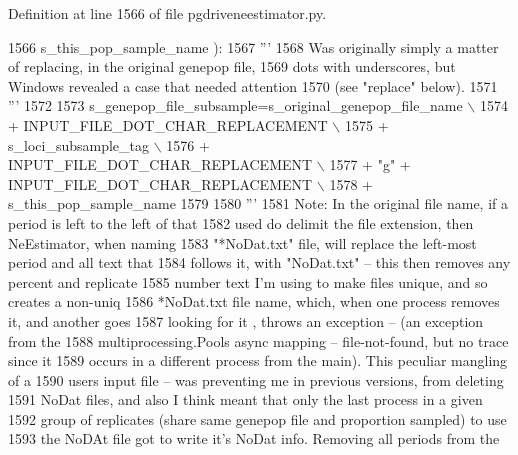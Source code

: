 Definition at line 1566 of file pgdriveneestimator.\+py.


\begin{DoxyCode}
1566                                                     s\_this\_pop\_sample\_name ):
1567     \textcolor{stringliteral}{'''}
1568 \textcolor{stringliteral}{    Was originally simply a matter of replacing, in the original genepop file,}
1569 \textcolor{stringliteral}{    dots with underscores, but Windows revealed a case that needed attention }
1570 \textcolor{stringliteral}{    (see "replace" below).}
1571 \textcolor{stringliteral}{    '''}
1572 
1573     s\_genepop\_file\_subsample=s\_original\_genepop\_file\_name \(\backslash\)
1574                                 + INPUT\_FILE\_DOT\_CHAR\_REPLACEMENT \(\backslash\)
1575                                 +  s\_loci\_subsample\_tag \(\backslash\)
1576                                 + INPUT\_FILE\_DOT\_CHAR\_REPLACEMENT \(\backslash\)
1577                                 + \textcolor{stringliteral}{"g"} + INPUT\_FILE\_DOT\_CHAR\_REPLACEMENT \(\backslash\)
1578                                 + s\_this\_pop\_sample\_name
1579     
1580     \textcolor{stringliteral}{'''}
1581 \textcolor{stringliteral}{    Note: In the original file name, if a period is left to the left of that}
1582 \textcolor{stringliteral}{    used do delimit the file extension, then NeEstimator, when naming}
1583 \textcolor{stringliteral}{    "*NoDat.txt" file, will replace the left-most period and all text that}
1584 \textcolor{stringliteral}{    follows it,  with "NoDat.txt" -- this then removes any percent and replicate}
1585 \textcolor{stringliteral}{    number text I'm using to make files unique, and so creates a non-uniq}
1586 \textcolor{stringliteral}{    *NoDat.txt file name, which, when one process removes it, and another goes}
1587 \textcolor{stringliteral}{    looking for it , throws an exception -- (an exception from the}
1588 \textcolor{stringliteral}{    multiprocessing.Pools async mapping -- file-not-found, but no trace since it}
1589 \textcolor{stringliteral}{    occurs in a different process from the main).  This peculiar mangling of a}
1590 \textcolor{stringliteral}{    users input file -- was preventing me in previous versions, from deleting}
1591 \textcolor{stringliteral}{    NoDat files, and also I think meant that only the last process in a given}
1592 \textcolor{stringliteral}{    group of replicates (share same genepop file and proportion sampled) to use}
1593 \textcolor{stringliteral}{    the NoDAt file got to write it's NoDat info.  Removing all periods from the}

\end{DoxyCode}
